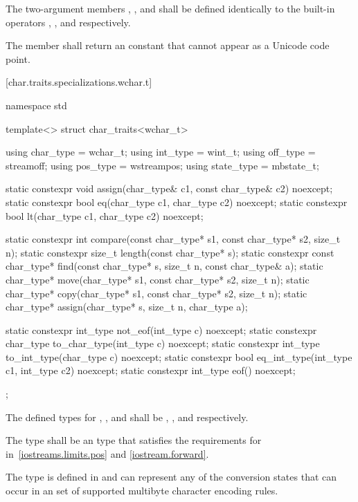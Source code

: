 \pnum
The two-argument members ,
, and  shall be defined identically to
the built-in operators \tcode{=}, \tcode{==}, and
\tcode{<} respectively.

\pnum
The member  shall return an
 constant that cannot appear as a Unicode
code point.

[char.traits.specializations.wchar.t]{}

%
\begin{codeblock}
namespace std {
  template<> struct char_traits<wchar_t> {
    using char_type  = wchar_t;
    using int_type   = wint_t;
    using off_type   = streamoff;
    using pos_type   = wstreampos;
    using state_type = mbstate_t;

    static constexpr void assign(char_type& c1, const char_type& c2) noexcept;
    static constexpr bool eq(char_type c1, char_type c2) noexcept;
    static constexpr bool lt(char_type c1, char_type c2) noexcept;

    static constexpr int compare(const char_type* s1, const char_type* s2, size_t n);
    static constexpr size_t length(const char_type* s);
    static constexpr const char_type* find(const char_type* s, size_t n,
                                           const char_type& a);
    static char_type* move(char_type* s1, const char_type* s2, size_t n);
    static char_type* copy(char_type* s1, const char_type* s2, size_t n);
    static char_type* assign(char_type* s, size_t n, char_type a);

    static constexpr int_type not_eof(int_type c) noexcept;
    static constexpr char_type to_char_type(int_type c) noexcept;
    static constexpr int_type to_int_type(char_type c) noexcept;
    static constexpr bool eq_int_type(int_type c1, int_type c2) noexcept;
    static constexpr int_type eof() noexcept;
  };
}
\end{codeblock}

\pnum
The defined types for
,
,
and
shall be
,
,
and
respectively.

\pnum
The type
shall be an  type that satisfies the requirements
for  in~\ref{iostreams.limits.pos} and \ref{iostream.forward}.

\pnum
The type
is defined in
and can represent any of the conversion states that can occur in an  set of supported multibyte character encoding rules.

